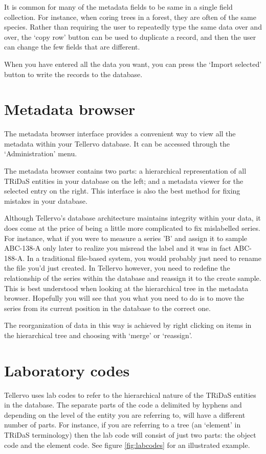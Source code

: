 It is common for many of the metadata fields to be same in a single field collection.  For instance, when coring trees in a forest, they are often of the same species.  Rather than requiring the user to repeatedly type the same data over and over, the `copy row' button can be used to duplicate a record, and then the user can change the few fields that are different.

When you have entered all the data you want, you can press the `Import selected' button to write the records to the database.  

\section{Metadata browser}
The metadata browser interface provides a convenient way to view all the metadata within your Tellervo database.  It can be accessed through the `Administration' menu.

The metadata browser contains two parts: a hierarchical representation of all TRiDaS entities in your database on the left; and a metadata viewer for the selected entry on the right.  This interface is also the best method for fixing mistakes in your database.  

Although Tellervo's database architecture maintains integrity within your data, it does come at the price of being a little more complicated to fix mislabelled series.  For instance, what if you were to measure a series 'B' and assign it to sample ABC-138-A only later to realize you misread the label and it was in fact ABC-188-A.  In a traditional file-based system, you would probably just need to rename the file you'd just created.  In Tellervo however, you need to redefine the relationship of the series within the database and reassign it to the create sample.  This is best understood when looking at the hierarchical tree in the metadata browser.  Hopefully you will see that you what you need to do is to move the series from its current position in the database to the correct one.  

The reorganization of data in this way is achieved by right clicking on items in the hierarchical tree and choosing with `merge' or `reassign'.


\section{Laboratory codes}
Tellervo uses lab codes to refer to the hierarchical nature of the TRiDaS entities in the database.  The separate parts of the code a delimited by hyphens and depending on the level of the entity you are referring to, will have a different number of parts.  For instance, if you are referring to a tree (an `element' in TRiDaS terminology) then the lab code will consist of just two parts: the object code and the element code.  See figure \ref{fig:labcodes} for an illustrated example.

